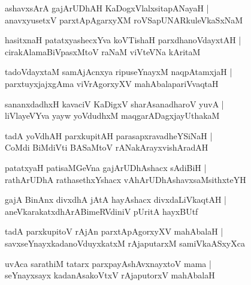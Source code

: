 \documentclass[twoside,12pt,openright]{book}
\newcounter{shloka}[chapter]
\begin{document}
\begin{shloka}%
ashavxsArA gajArUDhAH KaDogxVlalxsitapANayaH |\\
anavxyusetxV parxtApAgarxyXM roVSapUNARkuleVkaSxNaM 
\end{shloka}

\begin{shloka}%
hasitxnaH patatxyashecxYva koVTishaH parxdhanoVdayxtAH |\\
cirakAlamaBiVpasxMtoV raNaM viVteVNa kAritaM 
\end{shloka}

\begin{shloka}%
tadoVdayxtaM samAjAcnxya ripuseYnayxM naqpAtamxjaH |\\
parxtuyxjajxgAma viVrAgorxyXV mahAbalapariVvaqtaH 
\end{shloka}

\begin{shloka}%
sananxdadhxH kavaciV KaDigxV sharAsanadharoV yuvA |\\
liVlayeVYva yayw yoVdudhxM maqgarADagxjayUthakaM 
\end{shloka}

\begin{shloka}%
tadA yoVdhAH parxkupitAH parasapxravadheYSiNaH |\\
CoMdi BiMdiVti BASaMtoV rANakArayxvishAradAH 
\end{shloka}

\begin{shloka}%
patatxyaH patisaMGeVna gajArUDhAshacx sAdiBiH |\\
rathArUDhA rathasethxYshacx vAhArUDhAshavxsaMsithxteYH
\end{shloka}

\begin{shloka}%
gajA BinAnx divxdhA jAtA hayAshacx divxdaLiVkaqtAH |\\
aneVkarakatxdhArABimeRVdiniV pUritA hayxBUtf 
\end{shloka}

\begin{shloka}%
tadA parxkupitoV rAjAn parxtApAgorxyXV mahAbalaH |\\
savxseYnayxkadanoVduyxkatxM rAjaputarxM samiVkaASxyXca 
\end{shloka}

\begin{shloka}%
uvAca sarathiM tatarx parxpayAshAvxnayxtoV mama |\\
seYnayxsayx kadanAsakoVtxV rAjaputorxV mahAbalaH 
\end{shloka}
\end{document}
